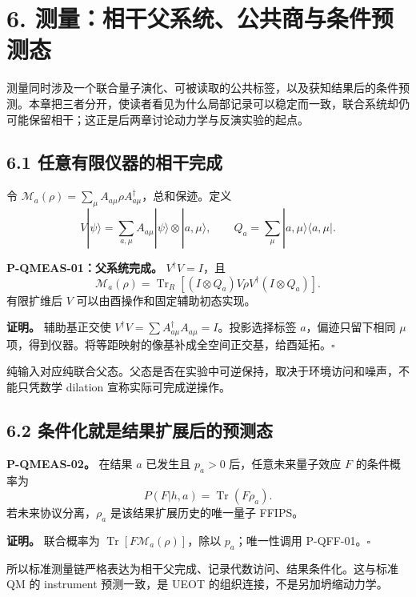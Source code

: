 \documentclass[
  11pt,
  oneside]{book}
\begin{document}
\chapter{6. 测量：相干父系统、公共商与条件预测态}\label{ch-6}\hypertarget{ch-6}{}

测量同时涉及一个联合量子演化、可被读取的公共标签，以及获知结果后的条件预测。本章把三者分开，使读者看见为什么局部记录可以稳定而一致，联合系统却仍可能保留相干；这正是后两章讨论动力学与反演实验的起点。

\section{6.1 任意有限仪器的相干完成}

令
\(\mathcal M_a(\rho)=\sum_\mu A_{a\mu}\rho A_{a\mu}^\dagger\)，总和保迹。定义
\[
V|\psi\rangle=\sum_{a,\mu}A_{a\mu}|\psi\rangle\otimes|a,\mu\rangle,\qquad
Q_a=\sum_\mu|a,\mu\rangle\langle a,\mu|.
\]

\protect\hypertarget{p-qmeas-01}{}{}

\textbf{P-QMEAS-01：父系统完成。} \(V^\dagger V=I\)，且 \[
\mathcal M_a(\rho)=
\operatorname{Tr}_R[(I\otimes Q_a)V\rho V^\dagger(I\otimes Q_a)].
\] 有限扩维后 \(V\) 可以由酉操作和固定辅助初态实现。

\textbf{证明。} 辅助基正交使
\(V^\dagger V=\sum A_{a\mu}^\dagger A_{a\mu}=I\)。投影选择标签
\(a\)，偏迹只留下相同 \(\mu\)
项，得到仪器。将等距映射的像基补成全空间正交基，给酉延拓。\(\square\)

纯输入对应纯联合父态。父态是否在实验中可逆保持，取决于环境访问和噪声，不能只凭数学
dilation 宣称实际可完成逆操作。

\section{6.2 条件化就是结果扩展后的预测态}

\protect\hypertarget{p-qmeas-02}{}{}

\textbf{P-QMEAS-02。} 在结果 \(a\) 已发生且 \(p_a>0\)
后，任意未来量子效应 \(F\) 的条件概率为 \[
P(F|h,a)=\operatorname{Tr}(F\rho_a).
\] 若未来协议分离，\(\rho_a\) 是该结果扩展历史的唯一量子 FFIPS。

\textbf{证明。} 联合概率为
\(\operatorname{Tr}[F\mathcal M_a(\rho)]\)，除以 \(p_a\)；唯一性调用
P-QFF-01。\(\square\)

所以标准测量链严格表达为相干父完成、记录代数访问、结果条件化。这与标准
QM 的 instrument 预测一致，是 UEOT 的组织连接，不是另加坍缩动力学。
\end{document}
